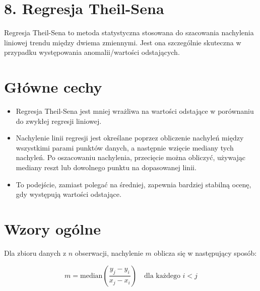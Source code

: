 {}
\justify
\fontsize{14}{16}\selectfont
\setlength{\parindent}{0pt}
\section*{8. Regresja Theil-Sena}
\fontsize{12}{14}\selectfont
\vspace{-1.0em}

\hspace{1.5cm} Regresja Theil-Sena to metoda statystyczna stosowana do szacowania nachylenia liniowej trendu między dwiema zmiennymi. Jest ona szczególnie skuteczna w przypadku występowania anomalii/wartości odstających.

{}
\section*{Główne cechy  \cite{url_theil_sen_robust_regression, url_theilsen_regression_and_estimator}}
\vspace{-1.0em}

\begin{itemize}

\item Regresja Theil-Sena jest mniej wrażliwa na wartości odstające w porównaniu do zwykłej regresji liniowej. 


\item Nachylenie linii regresji jest określane poprzez obliczenie nachyleń między wszystkimi parami punktów danych, a następnie wzięcie mediany tych nachyleń. 
Po oszacowaniu nachylenia, przecięcie można obliczyć, używając mediany reszt lub dowolnego punktu na dopasowanej linii.


\item To podejście, zamiast polegać na średniej, zapewnia bardziej stabilną ocenę, gdy występują wartości odstające.
\end{itemize}


{}
\section*{Wzory ogólne \cite{url_TheilSenRegressor}}
\vspace{-1.0em}

Dla zbioru danych z $n$ obserwacji, nachylenie $m$ oblicza się w następujący sposób:

$$
m = \text{median}\left(\frac{y_j - y_i}{x_j - x_i}\right) \quad \text{dla każdego } i < j
$$

